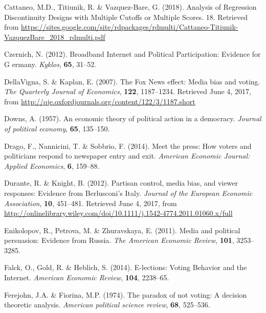 \documentclass[12pt,]{article}
\begin{document}
\leavevmode\hypertarget{ref-cattaneo_analysis_2018}{}%
Cattaneo, M.D., Titiunik, R. \& Vazquez-Bare, G. (2018). Analysis of
Regression Discontinuity Designs with Multiple Cutoffs or Multiple
Scores. 18. Retrieved from
\url{https://sites.google.com/site/rdpackages/rdmulti/Cattaneo-Titiunik-VazquezBare_2018_rdmulti.pdf}

\leavevmode\hypertarget{ref-czernich_broadband_2012}{}%
Czernich, N. (2012). Broadband Internet and Political Participation:
Evidence for G ermany. \emph{Kyklos}, \textbf{65}, 31--52.

\leavevmode\hypertarget{ref-dellavigna_fox_2007}{}%
DellaVigna, S. \& Kaplan, E. (2007). The Fox News effect: Media bias and
voting. \emph{The Quarterly Journal of Economics}, \textbf{122},
1187--1234. Retrieved June 4, 2017, from
\url{http://qje.oxfordjournals.org/content/122/3/1187.short}

\leavevmode\hypertarget{ref-downs_economic_1957}{}%
Downs, A. (1957). An economic theory of political action in a democracy.
\emph{Journal of political economy}, \textbf{65}, 135--150.

\leavevmode\hypertarget{ref-drago_meet_2014}{}%
Drago, F., Nannicini, T. \& Sobbrio, F. (2014). Meet the press: How
voters and politicians respond to newspaper entry and exit.
\emph{American Economic Journal: Applied Economics}, \textbf{6},
159--88.

\leavevmode\hypertarget{ref-durante_partisan_2012}{}%
Durante, R. \& Knight, B. (2012). Partisan control, media bias, and
viewer responses: Evidence from Berlusconi's Italy. \emph{Journal of the
European Economic Association}, \textbf{10}, 451--481. Retrieved June 4,
2017, from
\url{http://onlinelibrary.wiley.com/doi/10.1111/j.1542-4774.2011.01060.x/full}

\leavevmode\hypertarget{ref-enikolopov_media_2011}{}%
Enikolopov, R., Petrova, M. \& Zhuravskaya, E. (2011). Media and
political persuasion: Evidence from Russia. \emph{The American Economic
Review}, \textbf{101}, 3253--3285.

\leavevmode\hypertarget{ref-falck_e-lections:_2014}{}%
Falck, O., Gold, R. \& Heblich, S. (2014). E-lections: Voting Behavior
and the Internet. \emph{American Economic Review}, \textbf{104},
2238--65.

\leavevmode\hypertarget{ref-ferejohn_paradox_1974}{}%
Ferejohn, J.A. \& Fiorina, M.P. (1974). The paradox of not voting: A
decision theoretic analysis. \emph{American political science review},
\textbf{68}, 525--536.
\end{document}
